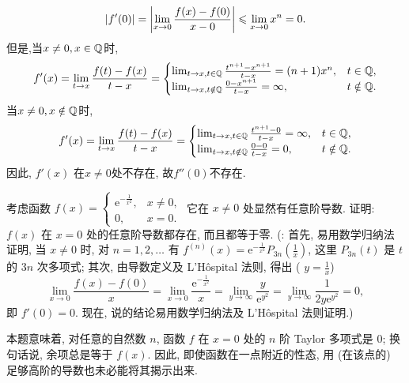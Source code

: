 \begin{solution}
    \begin{align*}
        |f'(0)| & =\left| \lim_{x \to 0} \frac{f(x) - f(0)}{x - 0} \right| \leqslant \lim_{x\to 0}x^n = 0. \\
    \end{align*}
    但是,当$x\ne 0,x \in \mathbb{Q}$时,
    \begin{align*}
        f'(x) = \lim_{t \to x} \frac{f(t) - f(x)}{t - x} = \begin{cases}
                                                               \lim_{t \to x, t \in \mathbb{Q}} \frac{t^{n+1} - x^{n+1}}{t - x} = (n+1)x^n, & t \in \mathbb{Q},    \\
                                                               \lim_{t \to x, t \notin \mathbb{Q}} \frac{0 - x^{n+1}}{t - x} = \infty,      & t \notin \mathbb{Q}.
                                                           \end{cases}
    \end{align*}
    当$x\ne 0,x \notin \mathbb{Q}$时,
    \begin{align*}
        f'(x) = \lim_{t \to x} \frac{f(t) - f(x)}{t - x} = \begin{cases}
                                                               \lim_{t \to x, t \in \mathbb{Q}} \frac{t^{n+1} - 0}{t - x} = \infty, & t \in \mathbb{Q},    \\
                                                               \lim_{t \to x, t \notin \mathbb{Q}} \frac{0 - 0}{t - x} = 0,         & t \notin \mathbb{Q}.
                                                           \end{cases}
    \end{align*}
    因此, $f'(x)$ 在$x\ne 0$处不存在, 故$f''(0)$不存在.
\end{solution}

\begin{exercise}[3.6.10]
    考虑函数 $f(x) = \begin{cases} \mathrm{e}^{-\frac{1}{x^2}}, & x \ne 0, \\ 0, & x = 0. \end{cases}$ 它在 $x \ne 0$ 处显然有任意阶导数. 证明: $f(x)$ 在 $x=0$ 处的任意阶导数都存在, 而且都等于零.
    (: 首先, 易用数学归纳法证明, 当 $x \ne 0$ 时, 对 $n=1, 2, \dots$ 有 $f^{(n)}(x) = \mathrm{e}^{-\frac{1}{x^2}} P_{3n}\left(\frac{1}{x}\right)$, 这里 $P_{3n}(t)$ 是 $t$ 的 $3n$ 次多项式; 其次, 由导数定义及 L'Hôspital 法则, 得出 ( $y = \frac{1}{x}$)
    $$\lim_{x \to 0} \frac{f(x) - f(0)}{x} = \lim_{x \to 0} \frac{\mathrm{e}^{-\frac{1}{x^2}}}{x} = \lim_{y \to \infty} \frac{y}{\mathrm{e}^{y^2}} = \lim_{y \to \infty} \frac{1}{2y \mathrm{e}^{y^2}} = 0,$$
    即 $f'(0) = 0$. 现在, 说的结论易用数学归纳法及 L'Hôspital 法则证明.)

    本题意味着, 对任意的自然数 $n$, 函数 $f$ 在 $x=0$ 处的 $n$ 阶 Taylor 多项式是 $0$; 换句话说, 余项总是等于 $f(x)$. 因此, 即使函数在一点附近的性态, 用 (在该点的) 足够高阶的导数也未必能将其揭示出来.
\end{exercise}


